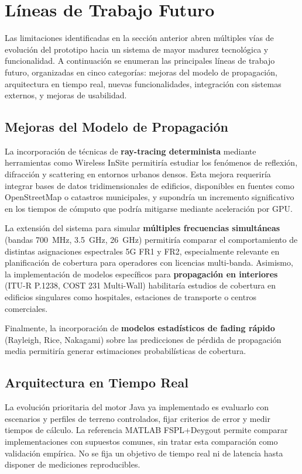 \section{Líneas de Trabajo Futuro}
\label{sec:futuro}

Las limitaciones identificadas en la sección anterior abren múltiples vías de evolución del prototipo hacia un sistema de mayor madurez tecnológica y funcionalidad. A continuación se enumeran las principales líneas de trabajo futuro, organizadas en cinco categorías: mejoras del modelo de propagación, arquitectura en tiempo real, nuevas funcionalidades, integración con sistemas externos, y mejoras de usabilidad.

\subsection*{Mejoras del Modelo de Propagación}

La incorporación de técnicas de \textbf{ray-tracing determinista} mediante herramientas como Wireless InSite permitiría estudiar los fenómenos de reflexión, difracción y scattering en entornos urbanos densos. Esta mejora requeriría integrar bases de datos tridimensionales de edificios, disponibles en fuentes como OpenStreetMap o catastros municipales, y supondría un incremento significativo en los tiempos de cómputo que podría mitigarse mediante aceleración por GPU.

La extensión del sistema para simular \textbf{múltiples frecuencias simultáneas} (bandas 700~MHz, 3.5~GHz, 26~GHz) permitiría comparar el comportamiento de distintas asignaciones espectrales 5G FR1 y FR2, especialmente relevante en planificación de cobertura para operadores con licencias multi-banda. Asimismo, la implementación de modelos específicos para \textbf{propagación en interiores} (ITU-R P.1238, COST 231 Multi-Wall) habilitaría estudios de cobertura en edificios singulares como hospitales, estaciones de transporte o centros comerciales.

Finalmente, la incorporación de \textbf{modelos estadísticos de fading rápido} (Rayleigh, Rice, Nakagami) sobre las predicciones de pérdida de propagación media permitiría generar estimaciones probabilísticas de cobertura.

\subsection*{Arquitectura en Tiempo Real}

La evolución prioritaria del motor Java ya implementado es evaluarlo con escenarios y
perfiles de terreno controlados, fijar criterios de error y medir tiempos de cálculo.
La referencia MATLAB FSPL+Deygout permite comparar implementaciones con supuestos
comunes, sin tratar esta comparación como validación empírica. No se fija un objetivo
de tiempo real ni de latencia hasta disponer de mediciones reproducibles.

